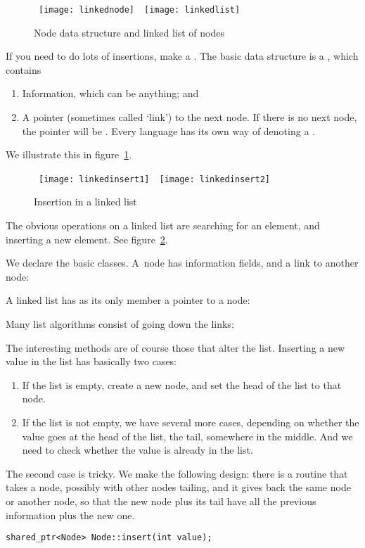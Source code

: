 \begin{figure}[ht]
\hbox{%
  \texttt{[image: linkednode]}
  \
  \texttt{[image: linkedlist]}
  }
  \caption{Node data structure and linked list of nodes}
  \label{fig:linked-node-list}
\end{figure}

If you need to do lots of insertions, make a
. The basic data structure is a ,
which contains 
\begin{enumerate}
\item
  Information, which can be anything; and
\item A pointer (sometimes called `link') to the next node. If there
  is no next node, the pointer will be \n{NULL}. Every language has
  its own way of denoting a \indextermsub{null}{pointer}.
\end{enumerate}

We illustrate this in figure~\ref{fig:linked-node-list}.

\begin{figure}[ht]
  \hbox{
  \texttt{[image: linkedinsert1]}
  \
  \texttt{[image: linkedinsert2]}
  }
  \caption{Insertion in a linked list}
  \label{fig:linked-list-insert}
\end{figure}

The obvious operations on a linked list are searching for an element,
and inserting a new element. See figure~\ref{fig:linked-list-insert}.


We declare the basic classes. A~node has information fields, and a
link to another node:
%

A linked list has as its only member a pointer to a node:
%

Many list algorithms consist of going down the links:
%

The interesting methods are of course those that alter the
list. Inserting a new value in the list has basically two cases:
\begin{enumerate}
\item If the list is empty, create a new node, and set the head of the
  list to that node.
\item If the list is not empty, we have several more cases, depending
  on whether the value goes at the head of the list, the tail,
  somewhere in the middle. And we need to check whether the value is
  already in the list.
\end{enumerate}
The second case is tricky. We make the following design: there is a
routine that takes a node, possibly with other nodes tailing, and it
gives back the same node or another node, so that the new node plus
its tail have all the previous information plus the new one.
\begin{verbatim}
shared_ptr<Node> Node::insert(int value);
\end{verbatim}

